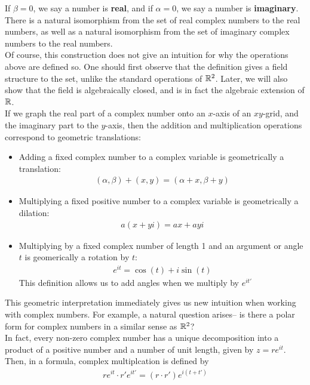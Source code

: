 \documentclass{memoir}
\begin{document}
If \(\beta=0\), we say a number is \textbf{real}, and if \(\alpha=0\), we say a number is \textbf{imaginary}. There is a natural isomorphism from the set of real complex numbers to the real numbers, as well as a natural isomorphism from the set of imaginary complex numbers to the real numbers.\\

Of course, this construction does not give an intuition for why the operations above are defined so. One should first observe that the definition gives a field structure to the set, unlike the standard operations of \(\mathbb{R}^2\). Later, we will also show that the field is algebraically closed, and is in fact the algebraic extension of \(\mathbb{R}\).\\

If we graph the real part of a complex number onto an \(x\)-axis of an \(xy\)-grid, and the imaginary part to the \(y\)-axis, then the addition and multiplication operations correspond to geometric translations:
\begin{itemize}
	\item Adding a fixed complex number to a complex variable is geometrically a translation:
		\begin{align*}
			(\alpha ,\beta ) + (x,y) = (\alpha +x,\beta +y)
		\end{align*}
	\item Multiplying a fixed positive number to a complex variable is geometrically a dilation:
	\begin{align*}
		a(x+yi) = ax + ayi
	\end{align*}
	\item Multiplying by a fixed complex number of length 1 and an argument or angle \(t\) is geomerically a rotation by \(t\):
		\begin{align*}
			e^{it} = \cos(t) + i \sin(t)
		\end{align*}
	This definition allows us to add angles when we multiply by \(e^{it'}\)
\end{itemize}
This geometric interpretation immediately gives us new intuition when working with complex numbers. For example, a natural question arises-- is there a polar form for complex numbers in a similar sense as \(\mathbb{R}^2\)?\\

In fact, every non-zero complex number has a unique decomposition into a product of a positive number and a number of unit length, given by \(z = re^{it}\). Then, in a formula, complex multiplcation is defined by
\begin{align*}
	re^{it} \cdot r'e^{it'} = (r\cdot r')e^{i(t+t')}
\end{align*}
\end{document}
